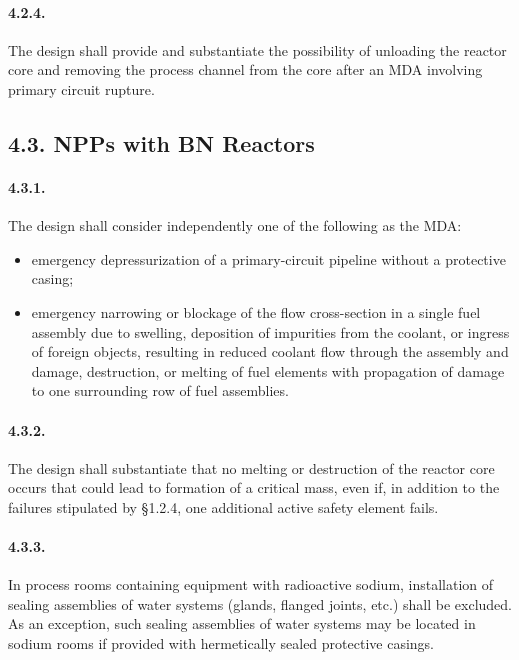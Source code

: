 \documentclass[openright]{bookest}
\begin{document}
\paragraph{4.2.4.}
The design shall provide and substantiate the possibility of unloading the reactor core and removing the process channel from the core after an MDA involving primary circuit rupture.

\subsection*{4.3. NPPs with BN Reactors}

\paragraph{4.3.1.}
The design shall consider independently one of the following as the MDA:
\begin{itemize}
    \item emergency depressurization of a primary-circuit pipeline without a protective casing;
    \item emergency narrowing or blockage of the flow cross-section in a single fuel assembly due to swelling, deposition of impurities from the coolant, or ingress of foreign objects, resulting in reduced coolant flow through the assembly and damage, destruction, or melting of fuel elements with propagation of damage to one surrounding row of fuel assemblies.
\end{itemize}

\paragraph{4.3.2.}
The design shall substantiate that no melting or destruction of the reactor core occurs that could lead to formation of a critical mass, even if, in addition to the failures stipulated by §1.2.4, one additional active safety element fails.

\paragraph{4.3.3.}
In process rooms containing equipment with radioactive sodium, installation of sealing assemblies of water systems (glands, flanged joints, etc.) shall be excluded.  
As an exception, such sealing assemblies of water systems may be located in sodium rooms if provided with hermetically sealed protective casings.
\end{document}
